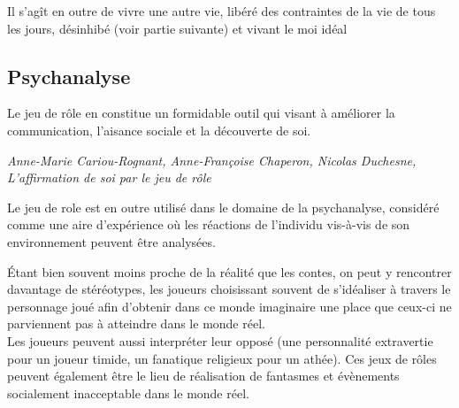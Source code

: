 Il s'agît en outre de vivre une autre vie, libéré des contraintes de la vie de tous les jours, désinhibé (voir partie suivante) et vivant le moi idéal

\subsection{Psychanalyse}
\begin{shadequote}
Le jeu de rôle en constitue un formidable outil qui visant à améliorer la communication, l'aisance sociale et la découverte de soi.
\par\emph{Anne-Marie Cariou-Rognant, Anne-Françoise Chaperon, Nicolas Duchesne, L'affirmation de soi par le jeu de rôle}
\end{shadequote}

Le jeu de role est en outre utilisé dans le domaine de la psychanalyse, considéré comme une aire d'expérience où les réactions de l'individu vis-à-vis de son environnement peuvent être analysées.

Étant bien souvent moins proche de la réalité que les contes, on peut y rencontrer davantage de stéréotypes, les joueurs choisissant souvent de s'idéaliser à travers le personnage joué afin d'obtenir dans ce monde imaginaire une place que ceux-ci ne parviennent pas à atteindre dans le monde réel.\\
Les joueurs peuvent aussi interpréter leur opposé (une personnalité extravertie pour un joueur timide, un fanatique religieux pour un athée). Ces jeux de rôles peuvent également être le lieu de réalisation de fantasmes et évènements socialement inacceptable dans le monde réel.

\clearpage
